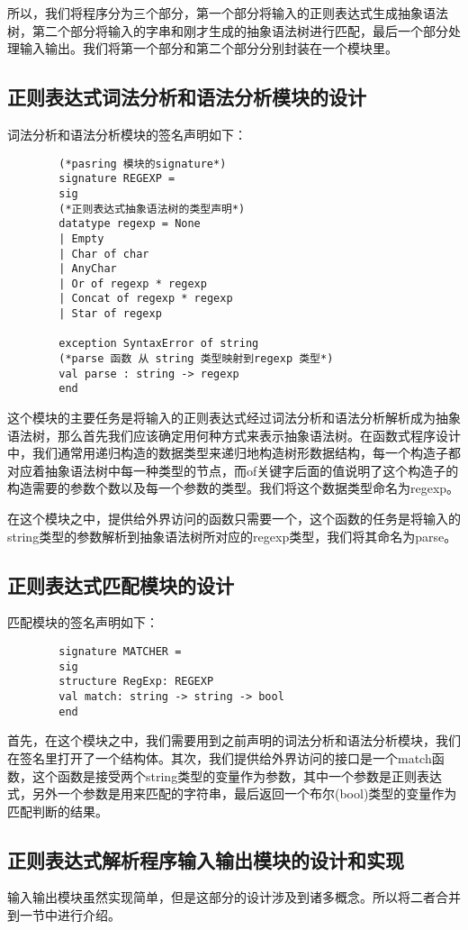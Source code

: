 \documentclass[openany,oneside]{book}
\theoremstyle{definition}
\theoremstyle{definition}
\begin{document}
	所以，我们将程序分为三个部分，第一个部分将输入的正则表达式生成抽象语法树，第二个部分将输入的字串和刚才生成的抽象语法树进行匹配，最后一个部分处理输入输出。我们将第一个部分和第二个部分分别封装在一个模块里。
	
	\subsection{正则表达式词法分析和语法分析模块的设计}
	词法分析和语法分析模块的签名声明如下：
	\begin{lstlisting}
		(*pasring 模块的signature*)
		signature REGEXP =
		sig
		(*正则表达式抽象语法树的类型声明*)
		datatype regexp = None
		| Empty
		| Char of char
		| AnyChar
		| Or of regexp * regexp
		| Concat of regexp * regexp
		| Star of regexp
		
		exception SyntaxError of string
		(*parse 函数 从 string 类型映射到regexp 类型*)
		val parse : string -> regexp
		end
	\end{lstlisting}




	这个模块的主要任务是将输入的正则表达式经过词法分析和语法分析解析成为抽象语法树，那么首先我们应该确定用何种方式来表示抽象语法树。在函数式程序设计中，我们通常用递归构造的数据类型来递归地构造树形数据结构，每一个构造子都对应着抽象语法树中每一种类型的节点，而of关键字后面的值说明了这个构造子的构造需要的参数个数以及每一个参数的类型。我们将这个数据类型命名为regexp。
	
	
	
	在这个模块之中，提供给外界访问的函数只需要一个，这个函数的任务是将输入的string类型的参数解析到抽象语法树所对应的regexp类型，我们将其命名为parse。
	
	\subsection{正则表达式匹配模块的设计}
	匹配模块的签名声明如下：
	\begin{lstlisting}
		signature MATCHER =
		sig
		structure RegExp: REGEXP
		val match: string -> string -> bool
		end
	\end{lstlisting}


	首先，在这个模块之中，我们需要用到之前声明的词法分析和语法分析模块，我们在签名里打开了一个结构体。其次，我们提供给外界访问的接口是一个match函数，这个函数是接受两个string类型的变量作为参数，其中一个参数是正则表达式，另外一个参数是用来匹配的字符串，最后返回一个布尔(bool)类型的变量作为匹配判断的结果。
	
	
	\subsection{正则表达式解析程序输入输出模块的设计和实现}
	输入输出模块虽然实现简单，但是这部分的设计涉及到诸多概念。所以将二者合并到一节中进行介绍。
	
\end{document}
